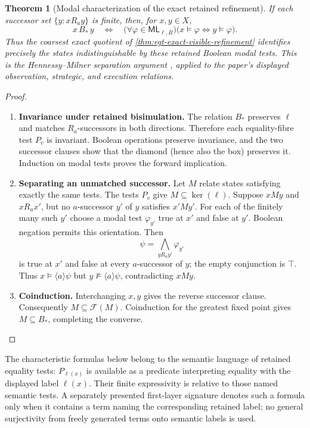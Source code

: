 \documentclass[11pt,a4paper]{article}
\numberwithin{equation}{section}
\newtheorem{theorem}{Theorem}[section]
\theoremstyle{definition}
\theoremstyle{remark}
\theoremstyle{plain}
\begin{document}
\begin{theorem}[Modal characterization of the exact retained refinement]
\label{thm:egt-hennessy-milner-agency}
If each successor set $\{y:xR_ay\}$ is finite, then, for $x,y\in X$,
\[
 x\,B_*\,y
 \quad\Longleftrightarrow\quad
 \bigl(\forall\varphi\in\mathsf{ML}_{\ell,R}\bigr)
 \bigl(x\models\varphi\Longleftrightarrow y\models\varphi\bigr).
\]
Thus the coarsest exact quotient of
\cref{thm:egt-exact-visible-refinement} identifies precisely the
states indistinguishable by these retained Boolean modal tests. This
is the Hennessy--Milner separation argument \citep{HennessyMilner1980,HennessyMilner1985},
applied to the paper's displayed observation, strategic, and execution
relations.
\end{theorem}
\begin{proof}
\leavevmode
\begin{enumerate}[label=\textup{(\arabic*)},leftmargin=*,itemsep=4pt,topsep=3pt]
  \item \textbf{Invariance under retained bisimulation.} The relation
$B_*$ preserves $\ell$ and matches $R_a$-successors in both directions.
Therefore each equality-fibre test $P_v$ is invariant. Boolean
operations preserve invariance, and the two successor clauses show
that the diamond (hence also the box) preserves it. Induction on
modal tests proves the forward implication.
  \item \textbf{Separating an unmatched successor.} Let $M$ relate states
satisfying exactly the same tests. The tests $P_v$ give
$M\subseteq\ker(\ell)$. Suppose $xMy$ and $xR_ax'$, but no
$a$-successor $y'$ of $y$ satisfies $x'My'$. For each of the finitely
many such $y'$ choose a modal test $\varphi_{y'}$ true at $x'$ and
false at $y'$. Boolean negation permits this orientation. Then
\[
 \psi=\bigwedge_{yR_ay'}\varphi_{y'}
\]
is true at $x'$ and false at every $a$-successor of $y$; the
empty conjunction is $\top$. Thus $x\models\langle a\rangle\psi$
but $y\not\models\langle a\rangle\psi$, contradicting $xMy$.
  \item \textbf{Coinduction.} Interchanging $x,y$ gives the reverse
successor clause. Consequently $M\subseteq\mathcal F(M)$.
Coinduction for the greatest fixed point gives $M\subseteq B_*$,
completing the converse.
\end{enumerate}
\end{proof}

The characteristic formulas below belong to the semantic language of
retained equality tests: $P_{\ell(x)}$ is available as a predicate
interpreting equality with the displayed label $\ell(x)$. Their finite
expressivity is relative to those named semantic tests. A separately
presented first-layer signature denotes such a formula only when it
contains a term naming the corresponding retained label; no general
surjectivity from freely generated terms onto semantic labels is used.
\end{document}

